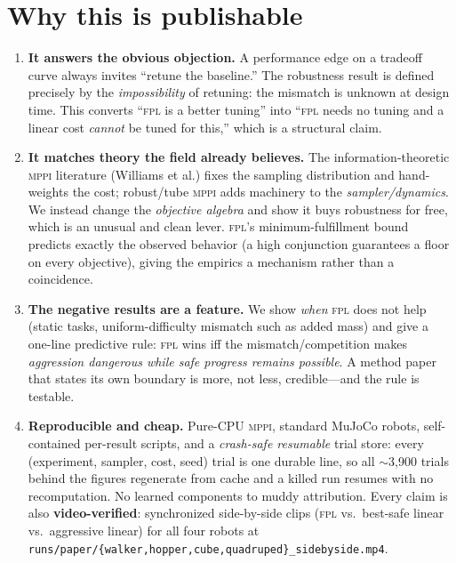 \documentclass[11pt]{article}
\newcommand{\fpl}{\textsc{fpl}}
\newcommand{\mppi}{\textsc{mppi}}
\newcommand{\claim}[1]{\textbf{\textcolor{blue!60!black}{#1}}}
\begin{document}
\section{Why this is publishable}

\begin{enumerate}[leftmargin=1.4em,itemsep=3pt]
\item \claim{It answers the obvious objection.} A performance edge on a tradeoff curve always
      invites ``retune the baseline.'' The robustness result is defined precisely by the
      \emph{impossibility} of retuning: the mismatch is unknown at design time. This converts
      ``\fpl{} is a better tuning'' into ``\fpl{} needs no tuning and a linear cost
      \emph{cannot} be tuned for this,'' which is a structural claim.
\item \claim{It matches theory the field already believes.} The information-theoretic \mppi{}
      literature (Williams et al.) fixes the sampling distribution and hand-weights the cost;
      robust/tube \mppi{} adds machinery to the \emph{sampler/dynamics}. We instead change the
      \emph{objective algebra} and show it buys robustness for free, which is an unusual and
      clean lever. \fpl{}'s minimum-fulfillment bound predicts exactly the observed behavior
      (a high conjunction guarantees a floor on every objective), giving the empirics a
      mechanism rather than a coincidence.
\item \claim{The negative results are a feature.} We show \emph{when} \fpl{} does not help
      (static tasks, uniform-difficulty mismatch such as added mass) and give a one-line
      predictive rule: \fpl{} wins iff the mismatch/competition makes \emph{aggression
      dangerous while safe progress remains possible}. A method paper that states its own
      boundary is more, not less, credible---and the rule is testable.
\item \claim{Reproducible and cheap.} Pure-CPU \mppi{}, standard MuJoCo robots, self-contained
      per-result scripts, and a \emph{crash-safe resumable} trial store: every
      (experiment, sampler, cost, seed) trial is one durable line, so all $\sim$3{,}900 trials
      behind the figures regenerate from cache and a killed run resumes with no recomputation. No
      learned components to muddy attribution. Every claim is also \textbf{video-verified}:
      synchronized side-by-side clips (\fpl{} vs.\ best-safe linear vs.\ aggressive linear) for all
      four robots at \texttt{runs/paper/\{walker,hopper,cube,quadruped\}\_sidebyside.mp4}.
\end{enumerate}
\end{document}
